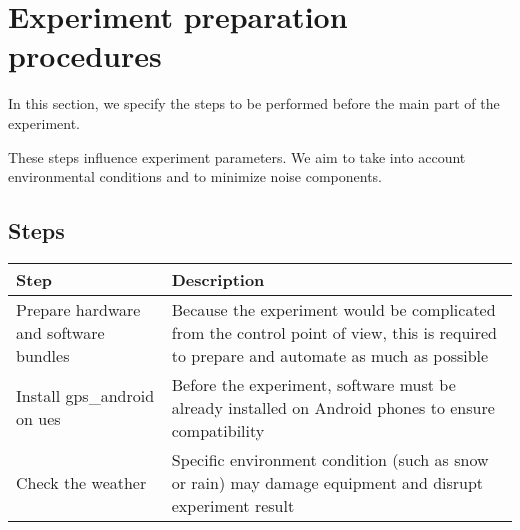 \section{Experiment preparation procedures}\label{experiment-preparation-procedures}

In this section, we specify the steps to be performed before the main
part of the experiment.

These steps influence experiment parameters. We aim to take into account
environmental conditions and to minimize noise components.

\subsection{Steps}\label{steps}

\begin{longtable}[]{@{}ll@{}}
\toprule
\begin{minipage}[b]{0.2\columnwidth}\raggedright
Step\strut
\end{minipage} & \begin{minipage}[b]{0.7\columnwidth}\raggedright
Description\strut
\end{minipage}\tabularnewline
\midrule
\endhead
\begin{minipage}[t]{0.2\columnwidth}\raggedright
Prepare hardware and software bundles\strut
\end{minipage} & \begin{minipage}[t]{0.7\columnwidth}\raggedright
Because the experiment would be complicated from the control point of
view, this is required to prepare and automate as much as possible\strut
\end{minipage}\tabularnewline
\begin{minipage}[t]{0.2\columnwidth}\raggedright
Install \gls{gps_android} on \glspl{ue}\strut
\end{minipage} & \begin{minipage}[t]{0.7\columnwidth}\raggedright
Before the experiment, software must be already installed on Android phones to
ensure compatibility\strut
\end{minipage}\tabularnewline
\begin{minipage}[t]{0.2\columnwidth}\raggedright
Check the weather\strut
\end{minipage} & \begin{minipage}[t]{0.7\columnwidth}\raggedright
Specific environment condition (such as snow or rain) may damage equipment
and disrupt experiment result\strut
\end{minipage}\tabularnewline

\end{longtable}
